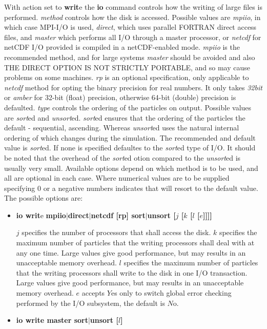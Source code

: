 \begin{enumerate}
\begin{enumerate}
With action set to {\bf writ}e the {\bf io} command
controls how the writing of large files is performed.
{\em method} controls how the disk is accessed.  Possible
values are {\em mpiio}, in which case MPI-I/O is used,
{\em direct}, which uses parallel FORTRAN direct access
files, and {\em master} which performs all I/O through
a master processor, or {\em netcdf} for netCDF I/O
provided \D is compiled in a netCDF-enabled mode.
{\em mpiio} is the recommended method, and for
large systems {\em master} should be avoided and also
THE DIRECT OPTION IS NOT STRICTLY PORTABLE, and so may
cause problems on some machines.  {\em rp} is an
optional specification, only applicable to {\em netcdf}
method for opting the binary precision for real numbers.
It only takes {\em 32bit} or {\em amber} for 32-bit
(float) precision, otherwise 64-bit (double) precision
is defaulted.  {\em type} controls the ordering of the
particles on output.  Possible values are {\em sort}ed
and {\em unsort}ed.  {\em sort}ed ensures that the
ordering of the particles the default - sequential,
ascending.  Whereas {\em unsort}ed uses the natural internal
ordering of \D which changes during the simulation.
The recommended and default value is {\em sort}ed.  If none
is specified \D defaultes to the {\em sort}ed type of I/O.
It should be noted that the overhead of the {\em sort}ed
otion compared to the {\em unsort}ed is usually very small.
Available options depend on which method is to be used, and
all are optional in each case.  Where numerical values are
to be supplied specifying 0 or a negative numbers
indicates that \D will resort to the default value.
The possible options are:

\begin{itemize}
\item {\bf io writ}e {\bf mpiio$|$direct$|$netcdf [rp] sort$|$unsort [$j$ [$k$ [$l$ [$e$]]]]}

$j$ specifies the number of processors that shall access
the disk.  $k$ specifies the maximum number of particles
that the writing processors shall deal with at any one time.
Large values give good performance, but may results in an
unacceptable memory overhead.  $l$ specifies the maximum
number of particles that the writing processors shall
write to the disk in one I/O transaction.  Large values
give good performance, but may results in an unacceptable
memory overhead.  $e$ accepts $Y$es only to switch global
error checking performed by the I/O subsystem, the default
is $N$o.

\item {\bf io write master sort$|$unsort [$l$]}


\end{itemize}
\end{enumerate}
\end{enumerate}
